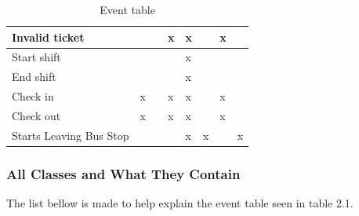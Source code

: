 \begin{table}[H]
{\begin{tabular}{|l|l|l|l|l|l|l|l|}
Invalid ticket             &           &                     & x      & x          &          & x              &     \\ \hline
Start shift                &           &                     &        & x          &          &                &     \\ \hline
End shift                  &           &                     &        & x          &          &                &     \\ \hline
Check in                   & x         &                     & x      & x          &          & x              &     \\ \hline
Check out                  & x         &                     & x      & x          &          & x              &     \\ \hline
Starts Leaving Bus Stop            &           &                     &        & x          & x        &                & x   \\ \hline
\end{tabular}%
}
\label{event-table}
\caption{Event table}
\end{table}

\subsubsection{All Classes and What They Contain}

The list bellow is made to help explain the event table seen in table 2.1.

